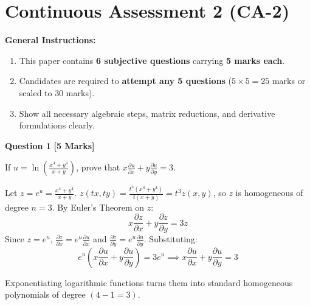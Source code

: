 \section{Continuous Assessment 2 (CA-2)}


\noindent
\textbf{General Instructions:}
\begin{enumerate}[topsep=2pt,itemsep=1pt]
    \item This paper contains \textbf{6 subjective questions} carrying \textbf{5 marks each}.
    \item Candidates are required to \textbf{attempt any 5 questions} ($5 \times 5 = 25$ marks or scaled to 30 marks).
    \item Show all necessary algebraic steps, matrix reductions, and derivative formulations clearly.
\end{enumerate}
\vspace{3mm}

\noindent\textbf{Question 1} \hfill \textbf{[5 Marks]}

If $u = \ln\left(\frac{x^4+y^4}{x+y}\right)$, prove that $x\frac{\partial u}{\partial x} + y\frac{\partial u}{\partial y} = 3$.

\begin{solbox}
Let $z = e^u = \frac{x^4+y^4}{x+y}$.
$z(tx, ty) = \frac{t^4(x^4+y^4)}{t(x+y)} = t^3 z(x,y)$, so $z$ is homogeneous of degree $n = 3$.
By Euler's Theorem on $z$:
\begin{equation}
x\frac{\partial z}{\partial x} + y\frac{\partial z}{\partial y} = 3z
\end{equation}
Since $z = e^u$, $\frac{\partial z}{\partial x} = e^u \frac{\partial u}{\partial x}$ and $\frac{\partial z}{\partial y} = e^u \frac{\partial u}{\partial y}$.
Substituting:
\begin{equation}
e^u \left( x\frac{\partial u}{\partial x} + y\frac{\partial u}{\partial y} \right) = 3e^u \implies x\frac{\partial u}{\partial x} + y\frac{\partial u}{\partial y} = 3
\end{equation}
\end{solbox}

\begin{examinertip}
Exponentiating logarithmic functions turns them into standard homogeneous polynomials of degree $(4-1=3)$.
\end{examinertip}

\vspace{4mm}

